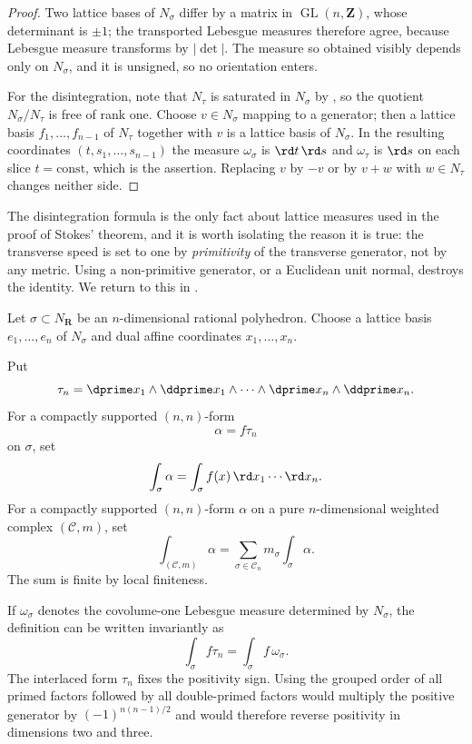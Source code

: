 \begin{proof}
Two lattice bases of $N_\sigma$ differ by a matrix in
$\operatorname{GL}(n,\mathbf Z)$, whose determinant is $\pm1$; the
transported Lebesgue measures therefore agree, because Lebesgue measure
transforms by $|\det|$.  The measure so obtained visibly depends only on
$N_\sigma$, and it is unsigned, so no orientation enters.

For the disintegration, note that $N_\tau$ is saturated in $N_\sigma$ by
, so the quotient $N_\sigma/N_\tau$ is free of
rank one.  Choose $v\in N_\sigma$ mapping to a generator; then a lattice
basis $f_1,\ldots,f_{n-1}$ of $N_\tau$ together with $v$ is a lattice basis
of $N_\sigma$.  In the resulting coordinates $(t,s_1,\ldots,s_{n-1})$ the
measure $\omega_\sigma$ is $\rd t\,\rd s$ and $\omega_\tau$ is $\rd s$ on
each slice $t=\text{const}$, which is the assertion.  Replacing $v$ by
$-v$ or by $v+w$ with $w\in N_\tau$ changes neither side.
\end{proof}

The disintegration formula is the only fact about lattice measures used in
the proof of Stokes' theorem, and it is worth isolating the reason it is
true: the transverse speed is set to one by \emph{primitivity} of the
transverse generator, not by any metric.  Using a non-primitive generator,
or a Euclidean unit normal, destroys the identity.  We return to this in
.

\medskip

Let $\sigma\subset N_{\mathbf R}$ be an $n$-dimensional rational
polyhedron.  Choose a lattice basis $e_1,\ldots,e_n$ of $N_\sigma$ and dual
affine coordinates $x_1,\ldots,x_n$.

\begin{definition}
\label{def:ch11-polyhedral-integral}
Put
\[
\tau_n=\dprime x_1\wedge \ddprime x_1\wedge\cdots\wedge \dprime x_n\wedge \ddprime x_n.
\]
For a compactly supported $(n,n)$-form
\[
\alpha=f\tau_n
\]
on $\sigma$, set
\[
                           \int_\sigma\alpha
             =\int_\sigma f(x)\,\rd x_1\cdots \rd x_n.
\]
For a compactly supported $(n,n)$-form $\alpha$ on a pure
$n$-dimensional weighted complex $(\mathscr C,m)$, set
\[
 \int_{(\mathscr C,m)}\alpha
 =\sum_{\sigma\in\mathscr C_n}m_\sigma\int_\sigma\alpha.
\]
The sum is finite by local finiteness.
\end{definition}

If $\omega_\sigma$ denotes the covolume-one Lebesgue measure determined by
$N_\sigma$, the definition can be written invariantly as
\[
                    \int_\sigma f\tau_n
                    =\int_\sigma f\,\omega_\sigma.
\]
The interlaced form $\tau_n$ fixes the positivity sign.  Using the grouped
order of all primed factors followed by all double-primed factors would
multiply the positive generator by $(-1)^{n(n-1)/2}$ and would therefore
reverse positivity in dimensions two and three.

